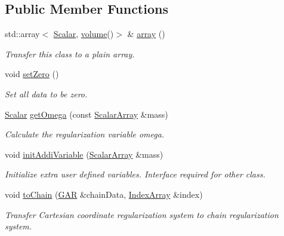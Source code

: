 \subsection*{Public Member Functions}
\begin{DoxyCompactItemize}
\item 
std\+::array$<$ \mbox{\hyperlink{class_g_a_r_a2ae44eda8e28d5dd26cf707dcda69314}{Scalar}}, \mbox{\hyperlink{class_g_a_r_abdbcc31db058125bd2ee207e7648b20b}{volume}}()$>$ \& \mbox{\hyperlink{class_g_a_r_a152aa5eea95fe568b010d85a7ba23bf7}{array}} ()
\begin{DoxyCompactList}\small\item\em Transfer this class to a plain array. \end{DoxyCompactList}\item 
void \mbox{\hyperlink{class_g_a_r_a3c59ee9bf8aae928644fa2beabbffa7c}{set\+Zero}} ()
\begin{DoxyCompactList}\small\item\em Set all data to be zero. \end{DoxyCompactList}\item 
\mbox{\hyperlink{class_g_a_r_a2ae44eda8e28d5dd26cf707dcda69314}{Scalar}} \mbox{\hyperlink{class_g_a_r_a3d5871f25d147497399fa65343bca84a}{get\+Omega}} (const \mbox{\hyperlink{class_g_a_r_a0b446684ae922457a3bf86c904085d8a}{Scalar\+Array}} \&mass)
\begin{DoxyCompactList}\small\item\em Calculate the regularization variable omega. \end{DoxyCompactList}\item 
void \mbox{\hyperlink{class_g_a_r_a31b5ad2527cc52d1422fa11e2d93fbc6}{init\+Addi\+Variable}} (\mbox{\hyperlink{class_g_a_r_a0b446684ae922457a3bf86c904085d8a}{Scalar\+Array}} \&mass)
\begin{DoxyCompactList}\small\item\em Initialize extra user defined variables. Interface required for other class. \end{DoxyCompactList}\item 
void \mbox{\hyperlink{class_g_a_r_a18041ac48dc47e6ada3e8a33893b1200}{to\+Chain}} (\mbox{\hyperlink{class_g_a_r}{G\+AR}} \&chain\+Data, \mbox{\hyperlink{class_g_a_r_aaf033049c0cd8f0f86a82b9595086fa5}{Index\+Array}} \&index)
\begin{DoxyCompactList}\small\item\em Transfer Cartesian coordinate regularization system to chain regularization system. \end{DoxyCompactList}\item 

\end{DoxyCompactItemize}
